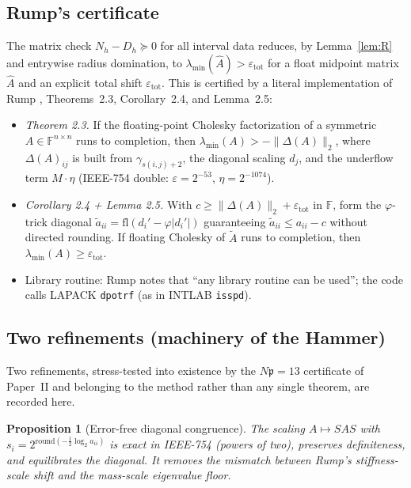 \documentclass[11pt]{amsart}
\newtheorem{proposition}[theorem]{Proposition}
\begin{document}
\subsection{Rump's certificate}

The matrix check $N_h-D_h\succeq 0$ for all interval data reduces, by
Lemma~\ref{lem:R} and entrywise radius domination, to
$\lambda_{\min}(\hat A)>\varepsilon_{\mathrm{tot}}$ for a float midpoint
matrix $\hat A$ and an explicit total shift $\varepsilon_{\mathrm{tot}}$.
This is certified by a literal implementation of Rump
\cite{Rump06}, Theorems~2.3, Corollary~2.4, and Lemma~2.5:

\begin{itemize}
\item \emph{Theorem 2.3.}  If the floating-point Cholesky factorization of
  a symmetric $A\in\mathbb{F}^{n\times n}$ runs to completion, then
  $\lambda_{\min}(A)>-\|\Delta(A)\|_2$, where $\Delta(A)_{ij}$ is built from
  $\gamma_{s(i,j)+2}$, the diagonal scaling $d_j$, and the underflow term
  $M\cdot\eta$ (IEEE-754 double: $\varepsilon=2^{-53}$, $\eta=2^{-1074}$).
\item \emph{Corollary 2.4 + Lemma 2.5.}  With $c\ge\|\Delta(A)\|_2
  +\varepsilon_{\mathrm{tot}}$ in $\mathbb{F}$, form the $\varphi$-trick
  diagonal $\tilde a_{ii}=\mathrm{fl}(d_i'-\varphi|d_i'|)$ guaranteeing
  $\tilde a_{ii}\le a_{ii}-c$ without directed rounding.  If floating
  Cholesky of $\tilde A$ runs to completion, then
  $\lambda_{\min}(A)\ge\varepsilon_{\mathrm{tot}}$.
\item Library routine: Rump notes that ``any library routine can be used'';
  the code calls LAPACK \texttt{dpotrf} (as in INTLAB \texttt{isspd}).
\end{itemize}

\subsection{Two refinements (machinery of the Hammer)}

Two refinements, stress-tested into existence by the $N\mathfrak{p}=13$
certificate of Paper~II and belonging to the method rather than any single
theorem, are recorded here.

\begin{proposition}[Error-free diagonal congruence]\label{prop:SAS}
The scaling $A\mapsto SAS$ with
$s_i=2^{\mathrm{round}(-\frac12\log_2 a_{ii})}$ is exact in IEEE-754
(powers of two), preserves definiteness, and equilibrates the diagonal.
It removes the mismatch between Rump's stiffness-scale shift and the
mass-scale eigenvalue floor.
\end{proposition}
\end{document}
